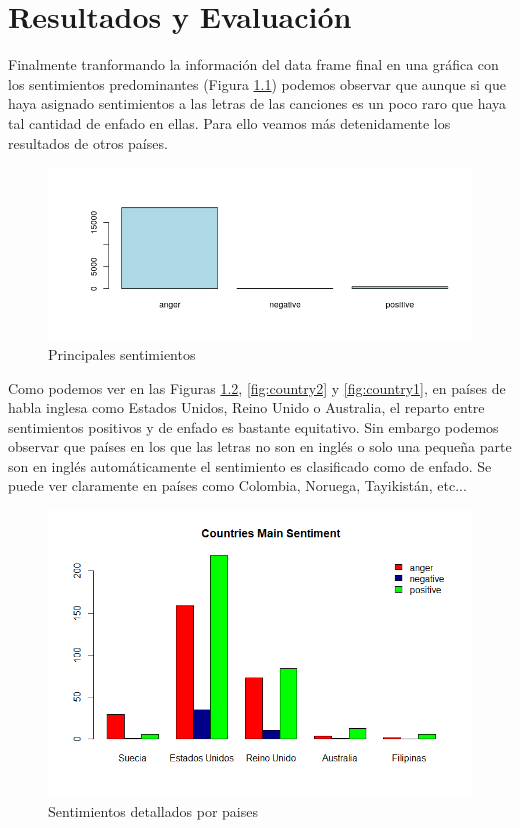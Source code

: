 \chapter{Resultados y Evaluación}
\label{cap:resultadosyevaluacion}

Finalmente tranformando la información del data frame final en una gráfica con los sentimientos predominantes (Figura \ref{fig:most_frecuent_sentiments}) podemos observar que aunque si que haya asignado sentimientos a las letras de las canciones es un poco raro que haya tal cantidad de enfado en ellas. Para ello veamos más detenidamente los resultados de otros países.

\begin{figure}[h]
	\centering
	\includegraphics[width=\linewidth]{Imagenes/most_frecuent_sentiments}
	\caption{Principales sentimientos}
	\label{fig:most_frecuent_sentiments}
\end{figure}

Como podemos ver en las Figuras \ref{fig:country12}, \ref{fig:country2} y \ref{fig:country1}, en países de habla inglesa como Estados Unidos, Reino Unido o Australia, el reparto entre sentimientos positivos y de enfado es bastante equitativo. Sin embargo podemos observar que países en los que las letras no son en inglés o solo una pequeña parte son en inglés automáticamente el sentimiento es clasificado como de enfado. Se puede ver claramente en países como Colombia, Noruega, Tayikistán, etc...

\begin{figure}[h]
	\centering
	\includegraphics[width=\linewidth]{Imagenes/country12}
	\caption{Sentimientos detallados por paises}
	\label{fig:country12}
\end{figure}

